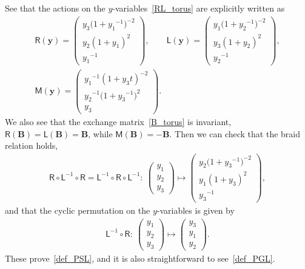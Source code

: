 \documentclass[10pt,a4paper]{amsart}
\numberwithin{equation}{section}
\begin{document}
See that the actions on the $y$-variables~\eqref{RL_torus} are explicitly written as
\begin{gather*}
 \mathsf{R}(\boldsymbol{y}) = \begin{pmatrix}
 y_3 \big( 1+{y_1}^{-1} \big)^{-2} \\
 y_2 ( 1+{y_1} )^{2} \\
 {y_1}^{-1}
 \end{pmatrix},
 \qquad
 \mathsf{L}(\boldsymbol{y}) = \begin{pmatrix}
 y_1 \big( 1+ {y_2}^{-1} \big)^{-2} \\
 y_3 ( 1+y_2 )^2 \\
 {y_2}^{-1}
 \end{pmatrix} , \\
 \mathsf{M}(\boldsymbol{y}) = \begin{pmatrix}
 {y_1}^{-1} (1+y_3t)^{-2} \\
 {y_2}^{-1} \big( 1+ {y_3}^{-1} \big)^2 \\
 y_3
 \end{pmatrix} .
\end{gather*}
We also see that the exchange matrix~\eqref{B_torus} is invariant, $\mathsf{R}(\mathbf{B}) =\mathsf{L}(\mathbf{B})=\mathbf{B}$, while $\mathsf{M}(\mathbf{B})= - \mathbf{B}$. Then we can check that the braid relation holds,
\begin{gather*}
 \mathsf{R} \circ \mathsf{L}^{-1} \circ \mathsf{R} = \mathsf{L}^{-1} \circ \mathsf{R} \circ \mathsf{L}^{-1}\colon \ \begin{pmatrix}
 y_1 \\ y_2 \\ y_3
 \end{pmatrix}
 \mapsto
 \begin{pmatrix}
 y_2 \big( 1+{y_3}^{-1} \big)^{-2} \\
 y_1 ( 1+y_3 )^2 \\
 {y_3}^{-1}
 \end{pmatrix} ,
\end{gather*}
and that the cyclic permutation on the $y$-variables is given by
\begin{gather*}
 \mathsf{L}^{-1} \circ \mathsf{R}\colon \
 \begin{pmatrix}
 y_1 \\ y_2 \\ y_3
 \end{pmatrix}
 \mapsto
 \begin{pmatrix}
 y_3 \\ y_1 \\ y_2
 \end{pmatrix} .
\end{gather*}
These prove~\eqref{def_PSL}, and it is also straightforward to see~\eqref{def_PGL}.
\end{document}
